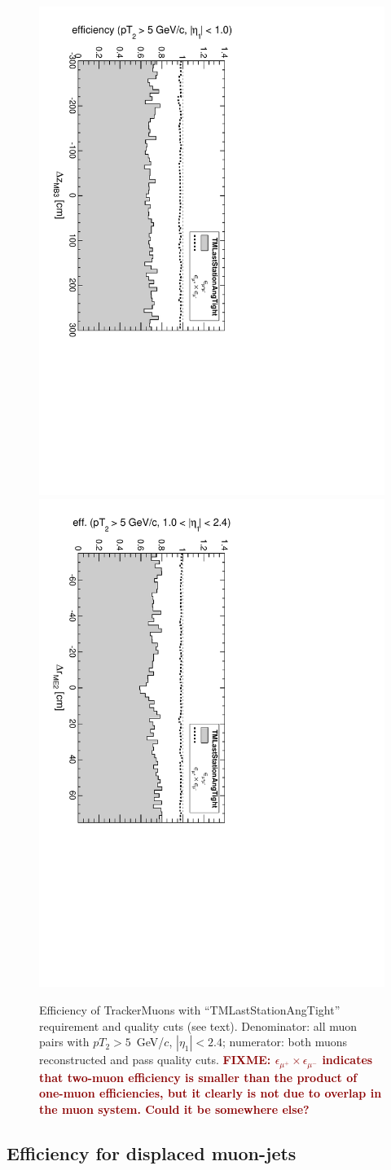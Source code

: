 \documentclass[12pt]{article}
\newcommand{\fixme}[1]{\textcolor{darkred}{\bf FIXME: #1}}
\begin{document}
\begin{figure}
\includegraphics[height=0.5\linewidth, angle=90]{fig/acceptance8_plot/vsmb3dz_TMLastStationAngTight.pdf}
\includegraphics[height=0.5\linewidth, angle=90]{fig/acceptance8_plot/vsme2dr_TMLastStationAngTight.pdf}

\caption{Efficiency of TrackerMuons with ``TMLastStationAngTight'' requirement and quality cuts (see text).  Denominator: all muon pairs with $pT_2 > 5$~GeV/$c$, $|\eta_1| < 2.4$; numerator: both muons reconstructed and pass quality cuts. \fixme{$\epsilon_{\mu^+} \times \epsilon_{\mu^-}$ indicates that two-muon efficiency is smaller than the product of one-muon efficiencies, but it clearly is not due to overlap in the muon system.  Could it be somewhere else?} \label{fig:efficiencies_TMLastStationAngTight}}
\end{figure}



\subsection{Efficiency for displaced muon-jets}
\end{document}
